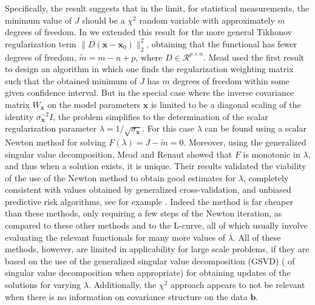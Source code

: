 \documentclass{report}
\begin{document}
Specifically, the result suggests that in the limit, for statistical
measurements, the minimum value of $J$ should be a $\chi^2$ random
variable with approximately $m$ degrees of freedom. In
\cite{meadrenaut:07} we extended this result for the more general
Tikhonov regularization term $\|D(\mathbf{x}-\mathbf{x}_0)\|_2^2$,
obtaining that the functional has fewer degrees of freedom,
$\tilde{m}=m-n+p$, where $D \in \mathcal{R}^{p\times n}$. Mead used the
first result to design an algorithm in which one finds the regularization
weighting matrix such that the obtained minimum of $J$ has $m$ degrees of
freedom within some given confidence interval. But in the special case
where the inverse covariance matrix $W_{\mathbf{x}}$ on the model
parameters $\mathbf{x}$ is limited to be a diagonal scaling of the
identity $\sigma_{\mathbf{x}}^{-2}I$, the problem simplifies to the
determination of the scalar regularization parameter
$\lambda=1/\sqrt{\sigma_{\mathbf{x}}}$. For this case $\lambda$ can be
found using a scalar Newton method for solving
$F(\lambda)=J-\tilde{m}=0$. Moreover, using the generalized singular
value decomposition, Mead and Renaut \cite{meadrenaut:07} showed that $F$
is monotonic in $\lambda$, and thus when a solution exists, it is unique.
Their results validated the viability of the use of the Newton method to
obtain good estimates for $\lambda$, completely consistent with values
obtained by generalized cross-validation, and unbiased predictive risk
algorithms, see for example \cite{Vogel:02}. Indeed the method is far
cheaper than these methods, only requiring a few steps of the Newton
iteration, as compared to these other methods and to the L-curve, all of
which usually involve evaluating the relevant functionals for many more
values of $\lambda$. All of these methods, however, are limited in
applicability for large scale problems, if they are based on the use of
the generalized singular value decomposition (GSVD) ( of singular value
decomposition when appropriate) for obtaining updates of the solutions
for varying $\lambda$. Additionally, the $\chi^2$ approach appears to not
be relevant when there is no information on covariance structure on the
data $\mathbf{b}$.
\end{document}
